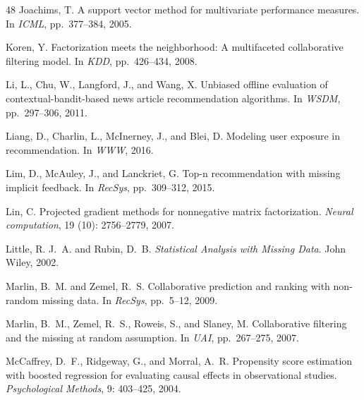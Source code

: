 \documentclass{article}
\begin{document}
\begin{thebibliography}{48}
Joachims, T.
\newblock A support vector method for multivariate performance measures.
\newblock In \emph{ICML}, pp.\  377--384, 2005.

Koren, Y.
\newblock Factorization meets the neighborhood: A multifaceted collaborative
  filtering model.
\newblock In \emph{KDD}, pp.\  426--434, 2008.

Li, L., Chu, W., Langford, J., and Wang, X.
\newblock Unbiased offline evaluation of contextual-bandit-based news article
  recommendation algorithms.
\newblock In \emph{WSDM}, pp.\  297--306, 2011.

Liang, D., Charlin, L., McInerney, J., and Blei, D.
\newblock Modeling user exposure in recommendation.
\newblock In \emph{WWW}, 2016.

Lim, D., McAuley, J., and Lanckriet, G.
\newblock Top-n recommendation with missing implicit feedback.
\newblock In \emph{RecSys}, pp.\  309--312, 2015.

Lin, C.
\newblock Projected gradient methods for nonnegative matrix factorization.
\newblock \emph{Neural computation}, 19 (10): 2756--2779,
  2007.

Little, R. J.~A. and Rubin, D.~B.
\newblock \emph{Statistical Analysis with Missing Data}.
\newblock John Wiley, 2002.

Marlin, B.~M. and Zemel, R.~S.
\newblock Collaborative prediction and ranking with non-random missing data.
\newblock In \emph{RecSys}, pp.\  5--12, 2009.

Marlin, B.~M., Zemel, R.~S., Roweis, S., and Slaney, M.
\newblock Collaborative filtering and the missing at random assumption.
\newblock In \emph{UAI}, pp.\  267--275, 2007.

McCaffrey, D.~F., Ridgeway, G., and Morral, A.~R.
\newblock Propensity score estimation with boosted regression for evaluating
  causal effects in observational studies.
\newblock \emph{Psychological Methods}, 9: 403--425, 2004.


\end{thebibliography}
\end{document}
